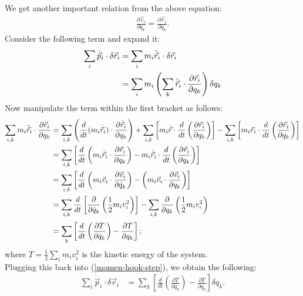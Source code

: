 \begin{enumerate}
    We get another important relation from the above equation:
    \begin{align}
        \frac{\partial\vec{v}_i}{\partial\dot{q}_k}=\frac{\partial\vec{r}_i}{\partial q_k}.
    \end{align}
    Consider the following term and expand it:
    \begin{align}
        \sum_i \dot{\vec{p}}_i\cdot\delta\vec{r}_i&=\sum_im_i \ddot{\vec{r}}_i\cdot\delta\vec{r}_i\notag\\
        &=\sum_im_i\left(\sum_k \ddot{\vec{r}}_i\cdot\frac{\partial\vec{r}_i}{\partial q_k}\right)\delta q_k\label{momen-hook-step}
    \end{align}
    Now manipulate the term within the first bracket as follows:
    \begin{align}
        \sum_{i,k}m_i \ddot{\vec{r}}_i\cdot\frac{\partial\vec{r}_i}{\partial q_k}&=\sum_{i,k}\left(\frac{d}{dt}(m_i\dot{\vec{r}}_i)\cdot\frac{\partial\dot{\vec{r}}_i}{\partial q_k}\right)+\sum_{i,k}\left[m_i\dot{\vec{r}}\cdot\frac{d}{dt}\left(\frac{\partial \vec{r}_i}{\partial q_k}\right)\right]-\sum_{i,k}\left[m_i\vec{r}_i\cdot\frac{d}{dt}\left(\frac{\partial \vec{r}_i}{\partial q_k}\right)\right]\notag\\
        &=\sum_{i,k}\left[\frac{d}{dt}\left(m_i\dot{\vec{r}}_i\cdot\frac{\partial\vec{r}_i}{\partial q_k}\right)-m_i\dot{\vec{r}}_i
        \cdot\frac{d}{dt}\left(\frac{\partial\vec{r}_i}{\partial q_k}\right)\right]\notag\\
        &=\sum_{i,k}\left[\frac{d}{dt}\left(m_i\vec{v}_i\cdot\frac{\partial\vec{v}_i}{\partial\dot{q}_k}\right)-\left(m_i\vec{v}_i\cdot\frac{\partial\vec{v}_i}{\partial q_k}\right)\right]\notag\\
        &=\sum_{i,k}\frac{d}{dt}\left[\frac{\partial }{\partial\dot{q}_k}\left(\frac{1}{2}m_iv_i^2\right)\right]-\sum_{i,k}\frac{\partial}{\partial{q}_k}\left(\frac{1}{2}m_iv_i^2\right)\notag\\[2pt]
        &=\sum_k\left[\frac{d}{dt}\left(\frac{\partial T}{\partial\dot{q}_k}\right)-\frac{\partial T}{\partial{q}_k}\right];
    \end{align}
    where $\displaystyle T = \frac{1}{2} \sum_i m_i v_i^2$ is the kinetic energy of the system.\\
    Plugging this back into (\ref{momen-hook-step}), we obtain the following:
    \begin{align}
            \sum_i \dot{\vec{p}}_i\cdot\delta\vec{r}_i&=\sum_k\left[\frac{d}{dt}\left(\frac{\partial T}{\partial\dot{q}_k}\right)-\frac{\partial T}{\partial{q}_k}\right]\delta q_k.\label{euler-lagrange-kinetic-only}

\end{align}
\end{enumerate}
